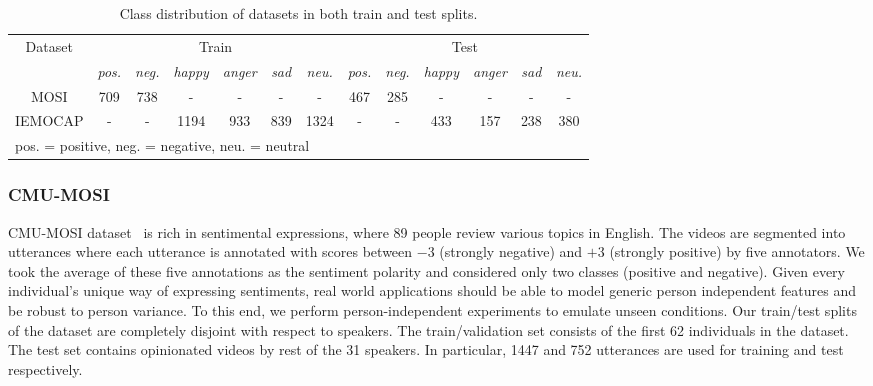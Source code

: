 \documentclass[review]{elsarticle}
\newcommand\?[1]{\hl{#1}}
\begin{document}
\begin{table}[h]
	\small
	      \addtolength\tabcolsep{-5pt} %
	\begin{center}
		\begin{tabular}{|*{14}{c|}}
			\hline
			\multicolumn{2}{|c|}{\multirow{2}{*}{Dataset}} & \multicolumn{6}{c|}{Train} & \multicolumn{6}{c|}{Test}\\ \cline{3-14}
			\multicolumn{2}{|c|}{}& \emph{pos.}&\emph{neg.}&\emph{happy}&\emph{anger}&\emph{sad}&\emph{neu.}&\emph{pos.}&\emph{neg.}&\emph{happy}&\emph{anger}&\emph{sad}&\emph{neu.}\\ \hline
			\multicolumn{2}{|c|}{MOSI}&709&738&-&-&-&-&467&285&-&-&-&-\\ \hline
			\multicolumn{2}{|c|}{IEMOCAP}&-&-&1194&933&839&1324&-&-&433&157&238&380\\ \hline
			\multicolumn{14}{l}{\scriptsize{pos. = positive, neg. = negative, neu. = neutral}}
		\end{tabular}
	\end{center}
	\vspace{-4.5mm}
	\caption {Class distribution of datasets in both train and test splits. }
	\label{tab:dataset}
\end{table}

\subsubsection{CMU-MOSI}
\label{sec:mosi}
CMU-MOSI dataset~\citep{zadeh2016multimodal} is rich in sentimental
expressions, where 89 people review various topics in English. The videos are
segmented into utterances where each utterance is annotated with scores between
$-3$ (strongly negative) and $+3$ (strongly positive) by five annotators. We
took the average of these five annotations as the sentiment polarity and
considered only two classes (positive and negative). Given every individual's
unique way of expressing sentiments, real world applications should be able to
model generic person independent features and be robust to person variance. To
this end, we perform person-independent experiments to emulate unseen
conditions. Our train/test splits of the dataset are completely disjoint with
respect to speakers. The train/validation set consists of the first 62
individuals in the dataset. The test set contains opinionated videos by rest of
the 31 speakers. In particular, 1447 and 752 utterances are used for training
and test respectively.
\end{document}
